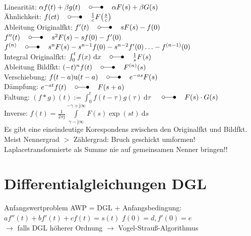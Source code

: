\documentclass[6pt,a4paper]{scrartcl}
\let\oldlaplace = \laplace
\renewcommand{\i}{\ensuremath{\mathrm{j}}}										%
\newcommand{\Ra}[0]{\ensuremath{\Rightarrow}}									%
\newcommand{\ra}[0]{\ensuremath{\rightarrow}} 									%
\newcommand{\diff}{\ensuremath{\ \mathrm d}}									%
\newcommand{\heavi}{\ensuremath{\mathrm{u}}}									%
\renewcommand{\laplace}{\ \; \oldlaplace \ \;}
\begin{document}
\begin{multicols}{4}
\begin{tabular}{rl|rl}
	\end{tabular}\\
	\everymath{\textstyle}
	Linearität: $\alpha f(t) + \beta g(t) \laplace \alpha F(s) + \beta G(s)$\\
	Ähnlichkeit: $f(ct) \laplace \frac{1}{c} F\bigl(  \frac{s}{c} \bigr)$\\
	Ableitung Originalfkt: $f'(t) \laplace s F(s) - f(0)$ \quad $f''(t) \laplace s^2 F(s) - sf(0) - f'(0)$\\
	$f^{(n)} \laplace s^n F(s) - s^{n-1} f(0) - s^{n-2} f'(0) \ldots - f^{(n-1)}(0)$\\
	Integral Originalfkt: $\int_0^t f(x) \diff x \laplace \frac{1}{s} F(s)$\\
	Ableitung Bildfkt: $(-t)^n f(t) \laplace F^{(n)} (s)$\\
	Verschiebung: $f(t-a)\heavi(t-a) \laplace e^{-as} F(s)$\\
	Dämpfung: $e^{-at} f(t) \laplace F(s+a)$\\
	Faltung: $(f * g)(t) := \int_0^t f( t - \tau) g(\tau) \diff \tau$ $\laplace F(s) \cdot G(s)$\\
	Inverse: $f(t) = \frac{1}{2\pi \i} \int\limits_{\gamma - \i \infty}^{-\gamma + \i \infty} F(s) \exp(st) \diff s$\\
	Es gibt eine eineindeutige Korespondens zwischen den Originalfkt und Bildfkt.
	Meist Nennergrad $>$ Zählergrad: Bruch geschickt umformen!
	Laplacetransformierte als Summe nie auf gemeinsamen Nenner bringen!!




\section{Differentialgleichungen DGL}



Anfangswertproblem AWP = DGL + Anfangsbedingung:\\
$a f''(t) + b f'(t) + c f(t) = s(t)$ \quad $f(0) = d, f'(0) = e$ \\
$\ra$ falls DGL höherer Ordnung $\ra$ Vogel-Strauß-Algorithmus


\end{multicols}
\end{document}
